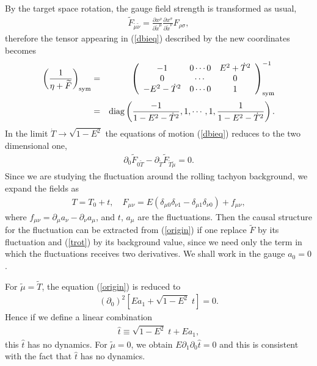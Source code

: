 \documentclass[a4paper,12pt]{article}
\newcommand{\p}{\partial}
\begin{document}
By the target space rotation, the gauge field strength is transformed
as usual, 
\begin{eqnarray}
  \widetilde{F}_{\tilde{\mu}\tilde{\nu}} = 
\frac{\p x^\rho}{\p \widetilde{x}^\mu}
\frac{\p x^\sigma}{\p \widetilde{x}^\nu} F_{\rho\sigma},
\end{eqnarray}
therefore the tensor appearing in (\ref{dbieq}) described by the new
coordinates becomes 
\begin{eqnarray}
\left(
\frac{1}{\eta + \widetilde{F}}
\right)_{\rm sym}
&=& \left(
\begin{array}{ccc}
-1 & 0 \cdots 0 & E^2 + \dot{T}^2 \\
0 & \cdots & 0 \\
-E^2 -\dot{T}^2 & 0 \cdots 0 & 1
\end{array}
\right)^{-1}_{\rm sym}
\nonumber \\[2pt]
&=& \mbox{diag}
\left(
\frac{-1}{1-E^2-\dot{T}^2}, 1, \cdots,1, 
\frac{1}{1-E^2-\dot{T}^2}
\right).
\end{eqnarray}
In the limit $\dot{T} \rightarrow \sqrt{1-E^2}$ the equations
of motion (\ref{dbieq}) reduces to the two dimensional one, 
\begin{eqnarray}
 \p_0 \widetilde{F}_{0 \widetilde{T}} - \p_{\widetilde{T}}
\widetilde{F}_{\widetilde{T}\widetilde{\mu}}=0.
\label{origin}
\end{eqnarray}
Since we are studying the fluctuation around the rolling tachyon
background, we expand the fields as 
\begin{eqnarray}
 T = T_0 + t, \quad 
  F_{\mu\nu} = E 
(\delta_{\mu 0} \delta_{\nu 1} - \delta_{\mu 1} \delta_{\nu 0})
+ f_{\mu\nu},
\end{eqnarray}
where $f_{\mu\nu}= \p_\mu a_\nu - \p_\nu a_\mu$, and $t$, $a_\mu$ are
the fluctuations. 
Then the causal structure for the fluctuation can be extracted from 
(\ref{origin}) if one replace $\widetilde{F}$ by its fluctuation and 
(\ref{trot}) by its background value, since we need only the term in
which the fluctuations receives two derivatives. We shall work in the
gauge $a_0=0$.

For $\widetilde{\mu}=\widetilde{T}$, the equation (\ref{origin}) is
reduced to
\begin{eqnarray}
  (\p_0)^2
\left[ E a_1 + \sqrt{1-E^2}\; t\right]=0.
\label{hatt}
\end{eqnarray}
Hence if we define a linear combination
\begin{eqnarray}
 \hat{t} \equiv \sqrt{1-E^2}\; t + E a_1,
\label{combin}
\end{eqnarray}
this $\hat{t}$ has no dynamics. For $\widetilde{\mu}=0$, we obtain 
$E \p_1 \p_0 \hat{t}=0$ and this is
consistent with the fact that $\hat{t}$ has no dynamics.
\end{document}
